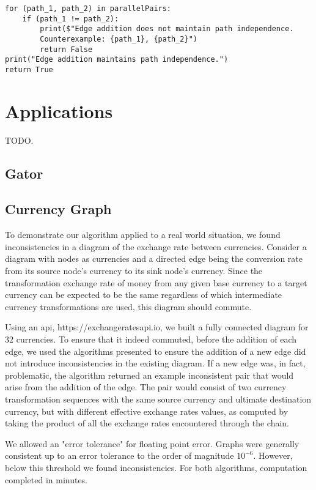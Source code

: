 \documentclass[sigplan,review,anonymous]{acmart}
\begin{document}
\begin{verbatim}
for (path_1, path_2) in parallelPairs:
    if (path_1 != path_2):
        print($"Edge addition does not maintain path independence. 
        Counterexample: {path_1}, {path_2}")
        return False
print("Edge addition maintains path independence.")
return True
\end{verbatim}

\section{Applications}
TODO.
\subsection{Gator}
\subsection{Currency Graph}

To demonstrate our algorithm applied to a real world situation, 
we found inconsistencies in a diagram of the exchange rate between currencies.
Consider a diagram with nodes as currencies and a directed edge being the
conversion rate from its source node's currency to its sink node's currency.
Since the transformation exchange rate of money from any given base currency to a target currency
can be expected to be the same regardless of which intermediate currency transformations
are used, this diagram should commute.

Using an api, https://exchangeratesapi.io, we built a fully connected diagram for 32 currencies.
To ensure that it indeed commuted, before the addition of each edge, we used the algorithms presented
to ensure the addition of a new edge did not introduce inconsistencies in the existing diagram.
If a new edge was, in fact, problematic, the algorithm returned an example inconsistent
pair that would arise from the addition of the edge.
The pair would consist of two currency transformation sequences with the 
same source currency and ultimate destination currency, but with different effective 
exchange rates values, as computed by taking the product of all the exchange rates
encountered through the chain.

We allowed an "error tolerance" for floating point error.
Graphs were generally consistent up to an error tolerance to the order of magnitude $10^{-6}$.
However, below this threshold we found inconsistencies.
For both algorithms, computation completed in minutes.
\end{document}
